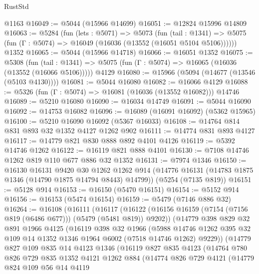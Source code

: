\begin{lexlean}{RustStd}
\begin{coremodule}
    @1163
@16049 := @5044 (@15966 @14699)
@16051 := @12824 @15996 @14809
@16063 := @5284
    (fun (lets : @5071) =>
    @5073
      (fun (tail : @1341) =>
      @5075 (fun (Γ : @5074) => @16049 (@16036 (@13552 (@16051 @5104 @5106))))))
    @1352
@16065 := @5044 (@15966 @14718)
@16066 := @16051 @1352
@16075 := @5308
    (fun (tail : @1341) => @5075 (fun (Γ : @5074) => @16065 (@16036 (@13552 (@16066 @5106)))))
    @4129
@16080 := @15966 (@5094 (@14677 (@13546 (@5103 @4130))))
@16081 := @5044 @16080
@16082 := @16066 @4129
@16088 := @5326 (fun (Γ : @5074) => @16081 (@16036 (@13552 @16082))) @14746
@16089 := @5210 @16080
@16090 := @16034 @14749
@16091 := @5044 @16090
@16092 := @14753 @16082
@16096 := @16089 (@16091 @16092) (@5362 @15965)
@16100 := @5210 @16090 @16092 (@5367 @16033)
@16108 := @14764 @814 @831 @893 @32 @1352 @4127 @1262 @902
@16111 := @14774 @831 @893 @4127
@16117 := @14779 @821 @830 @888 @892 @4101 @4126
@16119 := @5392 @14746 @1262
@16122 := @16119 @821 @888 @4101
@16130 := @7108 @14746 @1262 @819 @110 @677 @886 @32 @1352
@16131 := @7974 @1346
@16150 := @16130
    @16131
    @9420
    @30
    @1262
    @1262
    @914
    (@14776 @16131 (@14783 @1875 @1346 (@14790 @1875 @14794 @8443) @14799))
    (@5254 (@7135 @819))
@16151 := @5128 @914
@16153 := @16150 (@5470 @16151)
@16154 := @5152 @914
@16156 := @16153 (@5474 @16154)
@16159 := @5479 (@7146 @886 @32)
@16264 := @16108
    (@16111
      (@16117
        (@16122 (@16156 @16159 (@7154 (@7156 @819 (@6486 @677))) (@5479 (@5481 @819)) @9202))
        (@14779
          @398
          @829
          @32
          @891
          @1966
          @4125
          (@16119
            @398
            @32
            @1966
            (@5988
              @14746
              @1262
              @395
              @32
              @109
              @14
              @1352
              @1346
              @1964
              @6002
              (@7518 @14746 @1262)
              @9229))
          (@14779
            @827
            @109
            @835
            @14
            @4123
            @1346
            (@16119
              @827
              @835
              @4123
              (@14764
                @780
                @826
                @729
                @835
                @1352
                @4121
                @1262
                @884
                (@14774
                  @826
                  @729
                  @4121
                  (@14779
                    @824
                    @109
                    @56
                    @14
                    @4119

\end{coremodule}
\end{lexlean}
